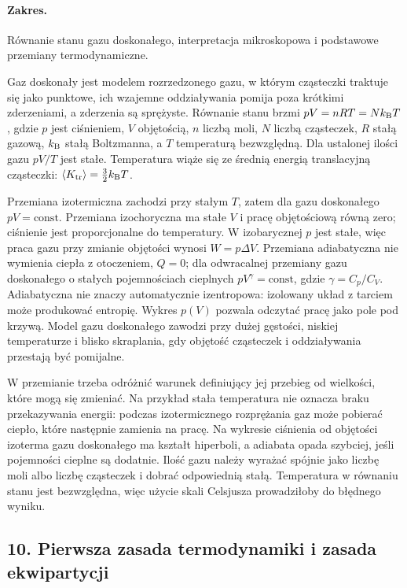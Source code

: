 \documentclass[11pt,a4paper]{article}
\begin{document}
\paragraph{Zakres.} Równanie stanu gazu doskonałego, interpretacja mikroskopowa i podstawowe przemiany termodynamiczne.

Gaz doskonały jest modelem rozrzedzonego gazu, w którym cząsteczki traktuje się jako punktowe, ich wzajemne oddziaływania pomija poza krótkimi zderzeniami, a zderzenia są sprężyste. Równanie stanu brzmi $pV=nRT=Nk_{\rm B}T$, gdzie $p$ jest ciśnieniem, $V$ objętością, $n$ liczbą moli, $N$ liczbą cząsteczek, $R$ stałą gazową, $k_{\rm B}$ stałą Boltzmanna, a $T$ temperaturą bezwzględną. Dla ustalonej ilości gazu $pV/T$ jest stałe. Temperatura wiąże się ze średnią energią translacyjną cząsteczki: $\langle K_{\rm tr}\rangle=\tfrac32k_{\rm B}T$.

Przemiana izotermiczna zachodzi przy stałym $T$, zatem dla gazu doskonałego $pV=\text{const}$. Przemiana izochoryczna ma stałe $V$ i pracę objętościową równą zero; ciśnienie jest proporcjonalne do temperatury. W izobarycznej $p$ jest stałe, więc praca gazu przy zmianie objętości wynosi $W=p\Delta V$. Przemiana adiabatyczna nie wymienia ciepła z otoczeniem, $Q=0$; dla odwracalnej przemiany gazu doskonałego o stałych pojemnościach cieplnych $pV^\gamma=\text{const}$, gdzie $\gamma=C_p/C_V$. Adiabatyczna nie znaczy automatycznie izentropowa: izolowany układ z tarciem może produkować entropię. Wykres $p(V)$ pozwala odczytać pracę jako pole pod krzywą. Model gazu doskonałego zawodzi przy dużej gęstości, niskiej temperaturze i blisko skraplania, gdy objętość cząsteczek i oddziaływania przestają być pomijalne.

W przemianie trzeba odróżnić warunek definiujący jej przebieg od wielkości, które mogą się zmieniać. Na przykład stała temperatura nie oznacza braku przekazywania energii: podczas izotermicznego rozprężania gaz może pobierać ciepło, które następnie zamienia na pracę. Na wykresie ciśnienia od objętości izoterma gazu doskonałego ma kształt hiperboli, a adiabata opada szybciej, jeśli pojemności cieplne są dodatnie. Ilość gazu należy wyrażać spójnie jako liczbę moli albo liczbę cząsteczek i dobrać odpowiednią stałą. Temperatura w równaniu stanu jest bezwzględna, więc użycie skali Celsjusza prowadziłoby do błędnego wyniku.

\subsection{10. Pierwsza zasada termodynamiki i zasada ekwipartycji}
\end{document}
